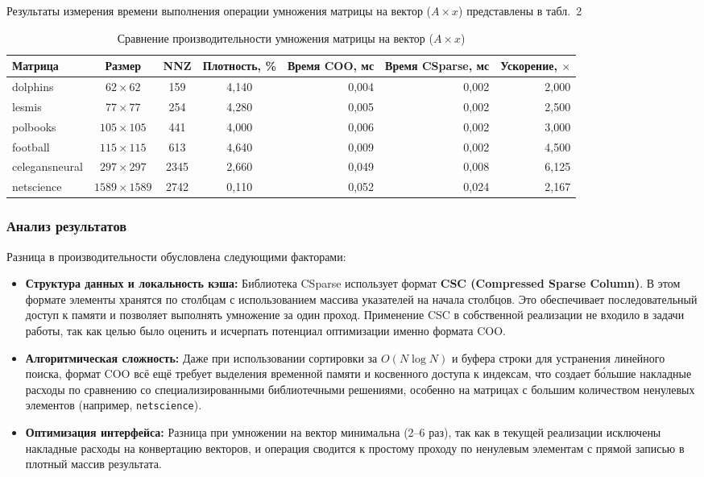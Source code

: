 \documentclass[a4paper]{article}
\begin{document}
Результаты измерения времени выполнения операции умножения матрицы на вектор ($A \times x$) представлены в табл.~2

\begin{table}[H]
\centering
\small
\caption{Сравнение производительности умножения матрицы на вектор ($A \times x$)}
\label{tab:mat_vec_combined}
\begin{tabular}{l c c c r r r}
\toprule
Матрица & Размер & NNZ & Плотность, \% & Время COO, мс & Время CSparse, мс & Ускорение, $\times$ \\
\midrule
dolphins & $62 \times 62$ & 159 & 4,140 & 0,004 & 0,002 & 2,000 \\
lesmis & $77 \times 77$ & 254 & 4,280 & 0,005 & 0,002 & 2,500 \\
polbooks & $105 \times 105$ & 441 & 4,000 & 0,006 & 0,002 & 3,000 \\
football & $115 \times 115$ & 613 & 4,640 & 0,009 & 0,002 & 4,500 \\
celegansneural & $297 \times 297$ & 2345 & 2,660 & 0,049 & 0,008 & 6,125 \\
netscience & $1589 \times 1589$ & 2742 & 0,110 & 0,052 & 0,024 & 2,167 \\
\bottomrule
\end{tabular}
\end{table}

\subsubsection{Анализ результатов}
Разница в производительности обусловлена следующими факторами:
\begin{itemize}
    \item \textbf{Структура данных и локальность кэша:} Библиотека CSparse использует формат \textbf{CSC (Compressed Sparse Column)}. В этом формате элементы хранятся по столбцам с использованием массива указателей на начала столбцов. Это обеспечивает последовательный доступ к памяти и позволяет выполнять умножение за один проход. Применение CSC в собственной реализации не входило в задачи работы, так как целью было оценить и исчерпать потенциал оптимизации именно формата COO.
    \item \textbf{Алгоритмическая сложность:} Даже при использовании сортировки за $O(N \log N)$ и буфера строки для устранения линейного поиска, формат COO всё ещё требует выделения временной памяти и косвенного доступа к индексам, что создает б\'{о}льшие накладные расходы по сравнению со специализированными библиотечными решениями, особенно на матрицах с большим количеством ненулевых элементов (например, \texttt{netscience}).
    \item \textbf{Оптимизация интерфейса:} Разница при умножении на вектор минимальна (2--6 раз), так как в текущей реализации исключены накладные расходы на конвертацию векторов, и операция сводится к простому проходу по ненулевым элементам с прямой записью в плотный массив результата.
\end{itemize}
\end{document}
